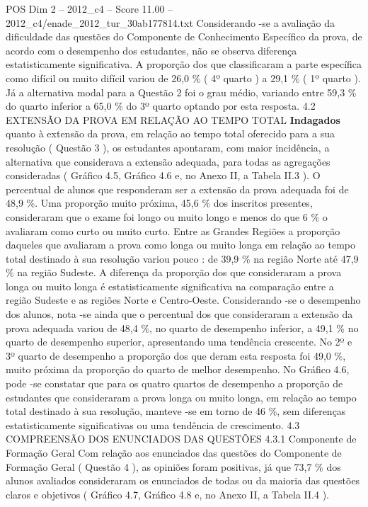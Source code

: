 \begin{textsample}{POS Dim 2 – 2012\_c4 – Score 11.00 – 2012\_c4/enade\_2012\_tur\_30ab177814.txt}
Considerando -se a avaliação da dificuldade das questões do Componente de Conhecimento Específico da prova, de acordo com o desempenho dos estudantes, não se observa diferença estatisticamente significativa.
A proporção dos que classificaram a parte específica como difícil ou muito difícil variou de 26,0 \% ( 4º quarto ) a 29,1 \% ( 1º quarto ).
Já a alternativa modal para a Questão 2 foi o grau médio, variando entre 59,3 \% do quarto inferior a 65,0 \% do 3º quarto optando por esta resposta. 4.2 EXTENSÃO DA PROVA EM RELAÇÃO AO TEMPO TOTAL \textbf{Indagados} quanto à extensão da prova, em relação ao tempo total oferecido para a sua resolução ( Questão 3 ), os estudantes apontaram, com maior incidência, a alternativa que considerava a extensão adequada, para todas as agregações consideradas ( Gráfico 4.5, Gráfico 4.6 e, no Anexo II, a Tabela II.3 ).
O percentual de alunos que responderam ser a extensão da prova adequada foi de 48,9 \%.
Uma proporção muito próxima, 45,6 \% dos inscritos presentes, consideraram que o exame foi longo ou muito longo e menos do que 6 \% o avaliaram como curto ou muito curto.
Entre as Grandes Regiões a proporção daqueles que avaliaram a prova como longa ou muito longa em relação ao tempo total destinado à sua resolução variou pouco : de 39,9 \% na região Norte até 47,9 \% na região Sudeste.
A diferença da proporção dos que consideraram a prova longa ou muito longa é estatisticamente significativa na comparação entre a região Sudeste e as regiões Norte e Centro-Oeste.
Considerando -se o desempenho dos alunos, nota -se ainda que o percentual dos que consideraram a extensão da prova adequada variou de 48,4 \%, no quarto de desempenho inferior, a 49,1 \% no quarto de desempenho superior, apresentando uma tendência crescente.
No 2º e 3º quarto de desempenho a proporção dos que deram esta resposta foi 49,0 \%, muito próxima da proporção do quarto de melhor desempenho.
No Gráfico 4.6, pode -se constatar que para os quatro quartos de desempenho a proporção de estudantes que consideraram a prova longa ou muito longa, em relação ao tempo total destinado à sua resolução, manteve -se em torno de 46 \%, sem diferenças estatisticamente significativas ou uma tendência de crescimento. 4.3 COMPREENSÃO DOS ENUNCIADOS DAS QUESTÕES 4.3.1 Componente de Formação Geral Com relação aos enunciados das questões do Componente de Formação Geral ( Questão 4 ), as opiniões foram positivas, já que 73,7 \% dos alunos avaliados consideraram os enunciados de todas ou da maioria das questões claros e objetivos ( Gráfico 4.7, Gráfico 4.8 e, no Anexo II, a Tabela II.4 ).

\end{textsample}
